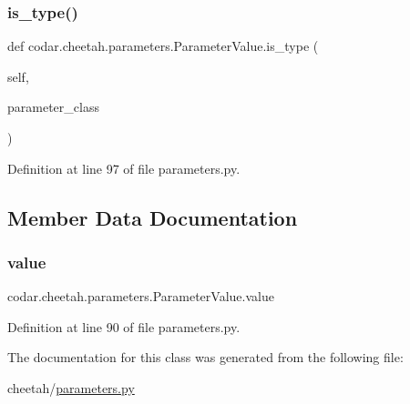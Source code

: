 \subsubsection{\texorpdfstring{is\+\_\+type()}{is\_type()}}
{\footnotesize\ttfamily def codar.\+cheetah.\+parameters.\+Parameter\+Value.\+is\+\_\+type (\begin{DoxyParamCaption}\item[{}]{self,  }\item[{}]{parameter\+\_\+class }\end{DoxyParamCaption})}



Definition at line 97 of file parameters.\+py.



\subsection{Member Data Documentation}
\mbox{\label{classcodar_1_1cheetah_1_1parameters_1_1_parameter_value_a270382b19fffc9efa6dd17119b8e1ba8}} 
\subsubsection{\texorpdfstring{value}{value}}
{\footnotesize\ttfamily codar.\+cheetah.\+parameters.\+Parameter\+Value.\+value}



Definition at line 90 of file parameters.\+py.



The documentation for this class was generated from the following file\+:\begin{DoxyCompactItemize}
\item 
cheetah/\hyperlink{parameters_8py}{parameters.\+py}\end{DoxyCompactItemize}
